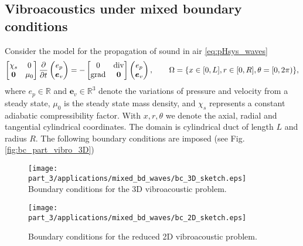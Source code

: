 \subsection{Vibroacoustics under mixed boundary conditions}
Consider the model for the propagation of sound in air \ref{eq:pHsys_waves}
\begin{equation}
\begin{bmatrix}
\chi_s & 0 \\
\bm{0} & \mu_0 \\
\end{bmatrix}
\diffp{}{t}
\begin{pmatrix}
e_p \\
\bm{e}_v \\
\end{pmatrix} = -
\begin{bmatrix}
0 & \div \\
\grad & \bm{0} \\
\end{bmatrix}
\begin{pmatrix}
e_p \\
\bm{e}_v \\
\end{pmatrix}, \qquad \Omega = \{x \in [0, L], r \in [0, R], \theta = [0, 2 \pi)\},
\end{equation}
where $e_p \in \mathbb{R}$  and $\bm{e}_v \in \mathbb{R}^3$ denote the variations of pressure and velocity from a steady state, $\mu_0$ is the steady state mass density, and $\chi_s$ represents a constant adiabatic compressibility factor. With $x, r, \theta$ we denote the axial, radial and tangential cylindrical coordinates.  The domain is cylindrical duct of length $L$ and radius $R$. The following boundary conditions are imposed (see Fig. \ref{fig:bc_part_vibro_3D})

\begin{figure}[t]
	\begin{minipage}[b]{0.48\linewidth}
		\centering
		\texttt{[image: part\_3/applications/mixed\_bd\_waves/bc\_3D\_sketch.eps]} \\
		\caption{Boundary conditions for the 3D vibroacoustic problem.}
		\label{fig:bc_part_vibro_3D}
	\end{minipage}
	\hspace{0.5cm}
	\begin{minipage}[b]{0.48\linewidth}
		\centering
	\texttt{[image: part\_3/applications/mixed\_bd\_waves/bc\_2D\_sketch.eps]} \\
	\caption{Boundary conditions for the reduced 2D vibroacoustic problem.}
	\label{fig:bc_part_vibro_2D}
	\end{minipage}
\end{figure}


